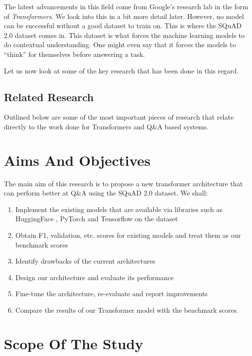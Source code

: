 \documentclass[12pt]{report}
\begin{document}
        The latest advancements in this field come from Google's research lab in the form of \textit{Transformers}. We look into this in a bit more detail later. However, no model can be successful without a good dataset to train on. This is where the SQuAD 2.0 dataset \citep{dataset} comes in. This dataset is what forces the machine learning models to do contextual understanding. One might even say that it forces the models to ``think'' for themselves before answering a task.

        Let us now look at some of the key research that has been done in this regard.

        \subsection{Related Research}\label{rr}
        Outlined below are some of the most important pieces of research that relate directly to the work done for Transformers and Q\&A based systems.

        \section{Aims And Objectives}\label{12}
        	The main aim of this research is to propose a new transformer architecture that can perform better at Q\&A using the SQuAD 2.0 dataset.
        We shall:
        \begin{enumerate}
        	\item Implement the existing models that are available via libraries such as HuggingFace \citep{hfTransformers}, PyTorch and Tensorflow on the dataset
        	\item Obtain F1, validation, etc. scores for existing models and treat them as our benchmark scores
        	\item Identify drawbacks of the current architectures
        	\item Design our architecture and evaluate its performance
        	\item Fine-tune the architecture, re-evaluate and report improvements
        	\item Compare the results of our Transformer model with the benchmark scores.
        \end{enumerate}

        \section{Scope Of The Study}\label{13}
\end{document}

